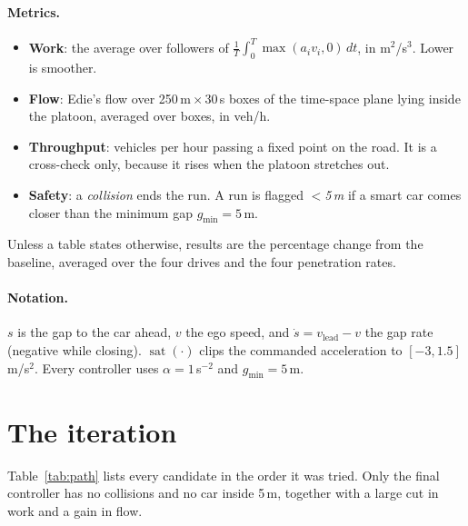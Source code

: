 \documentclass[11pt]{article}
\newcommand{\sat}{\operatorname{sat}}
\begin{document}
\paragraph{Metrics.}
\begin{itemize}
\item \textbf{Work}: the average over followers of $\frac{1}{T}\int_0^T \max(a_i v_i,0)\,dt$, in
  m$^2$/s$^3$. Lower is smoother.
\item \textbf{Flow}: Edie's flow over 250\,m\,$\times$\,30\,s boxes of the time-space plane lying inside
  the platoon, averaged over boxes, in veh/h.
\item \textbf{Throughput}: vehicles per hour passing a fixed point on the road. It is a cross-check only,
  because it rises when the platoon stretches out.
\item \textbf{Safety}: a \emph{collision} ends the run. A run is flagged \emph{$<$5\,m} if a smart car
  comes closer than the minimum gap $g_{\min}=5$\,m.
\end{itemize}
Unless a table states otherwise, results are the percentage change from the baseline, averaged over the
four drives and the four penetration rates.

\paragraph{Notation.}
$s$ is the gap to the car ahead, $v$ the ego speed, and $\dot s = v_{\text{lead}}-v$ the gap rate (negative
while closing). $\sat(\cdot)$ clips the commanded acceleration to $[-3, 1.5]$\,m/s$^2$. Every controller
uses $\alpha=1$\,s$^{-2}$ and $g_{\min}=5$\,m.

\section{The iteration}
\label{sec:iteration}

Table~\ref{tab:path} lists every candidate in the order it was tried. Only the final controller has no
collisions and no car inside 5\,m, together with a large cut in work and a gain in flow.


\end{document}
